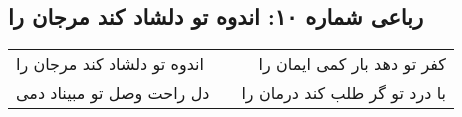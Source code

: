 \begin{center}
\section*{رباعی شماره ۱۰: اندوه تو دلشاد کند مرجان را}
\label{sec:sh010}
\begin{longtable}{l p{0.5cm} r}
اندوه تو دلشاد کند مرجان را
&&
کفر تو دهد بار کمی ایمان را
\\
دل راحت وصل تو مبیناد دمی
&&
با درد تو گر طلب کند درمان را
\\
\end{longtable}
\end{center}
